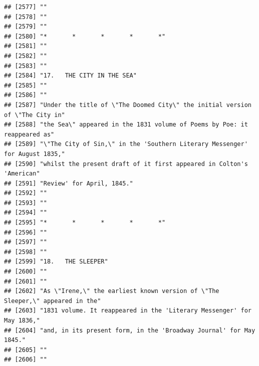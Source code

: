 \documentclass{article}\usepackage[]{graphicx}\usepackage[]{color}
\makeatletter
\newenvironment{kframe}{%
 \def\at@end@of@kframe{}%
 \ifinner\ifhmode%
  \def\at@end@of@kframe{\end{minipage}}%
  \begin{minipage}{\columnwidth}%
 \fi\fi%
 \def\FrameCommand##1{\hskip\@totalleftmargin \hskip-\fboxsep
 \colorbox{shadecolor}{##1}\hskip-\fboxsep
     \hskip-\linewidth \hskip-\@totalleftmargin \hskip\columnwidth}%
 \MakeFramed {\advance\hsize-\width
   \@totalleftmargin\z@ \linewidth\hsize
   \@setminipage}}%
 {\par\unskip\endMakeFramed%
 \at@end@of@kframe}
\newenvironment{knitrout}{}{} %
\makeatother
\begin{document}
\begin{knitrout}
\begin{kframe}
\begin{verbatim}
## [2577] ""                                                                            
## [2578] ""                                                                            
## [2579] ""                                                                            
## [2580] "*       *       *       *       *"                                           
## [2581] ""                                                                            
## [2582] ""                                                                            
## [2583] ""                                                                            
## [2584] "17.   THE CITY IN THE SEA"                                                   
## [2585] ""                                                                            
## [2586] ""                                                                            
## [2587] "Under the title of \"The Doomed City\" the initial version of \"The City in" 
## [2588] "the Sea\" appeared in the 1831 volume of Poems by Poe: it reappeared as"     
## [2589] "\"The City of Sin,\" in the 'Southern Literary Messenger' for August 1835,"  
## [2590] "whilst the present draft of it first appeared in Colton's 'American"         
## [2591] "Review' for April, 1845."                                                    
## [2592] ""                                                                            
## [2593] ""                                                                            
## [2594] ""                                                                            
## [2595] "*       *       *       *       *"                                           
## [2596] ""                                                                            
## [2597] ""                                                                            
## [2598] ""                                                                            
## [2599] "18.   THE SLEEPER"                                                           
## [2600] ""                                                                            
## [2601] ""                                                                            
## [2602] "As \"Irene,\" the earliest known version of \"The Sleeper,\" appeared in the"
## [2603] "1831 volume. It reappeared in the 'Literary Messenger' for May 1836,"        
## [2604] "and, in its present form, in the 'Broadway Journal' for May 1845."           
## [2605] ""                                                                            
## [2606] ""                                                                            

\end{verbatim}
\end{kframe}
\end{knitrout}
\end{document}

